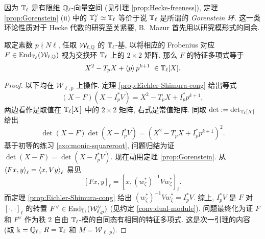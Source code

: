 \begin{remark}
	因为 $\mathbb{T}_\ell$ 是有限维 $\mathbb{Q}_\ell$-向量空间 (见引理 \ref{prop:Hecke-freeness}), 定理 \ref{prop:Gorenstein} (ii) 中的 $\mathbb{T}_\ell^\vee \simeq \mathbb{T}_\ell$ 等价于说 $\mathbb{T}_\ell$ 是所谓的 \emph{Gorenstein 环}. 这一类环论性质对于 Hecke 代数的研究至关紧要, B.\ Mazur 首先用以研究模形式的同余.
\end{remark}

\begin{theorem}\label{prop:Hecke-polynomial}
	取定素数 $p \nmid N\ell$, 任取 $\mathcal{W}_{\ell, \mathbb{Q}}$ 的 $\mathbb{T}_\ell$-基, 以将相应的 Frobenius 对应 $F \in \operatorname{End}_{\mathbb{T}_\ell}(\mathcal{W}_{\ell, \mathbb{Q}})$ 视为交换环 $\mathbb{T}_\ell$ 上的 $2 \times 2$ 矩阵. 那么 $F$ 的特征多项式等于
	\[ X^2 - T_p X + \left\langle p \right\rangle p^{k+1} \; \in \mathbb{T}_\ell[X]. \]
\end{theorem}
\begin{proof}
	以下均在 $\mathcal{W}_{\ell, p}$ 上操作. 定理 \ref{prop:Eichler-Shimura-cong} 给出等式
	\[ (X - F) (X - I_p^* V ) = X^2 - T_p X + I_p^* p^{k+1}, \]
	两边看作是取值在 $\mathbb{T}_\ell[X]$ 中的 $2 \times 2$ 矩阵, 右式是常值矩阵. 同取 $\det := \det_{\mathbb{T}_\ell[X]}$ 给出
	\[ \det\left( X - F \right) \det\left(X - I_p^* V \right) = \left( X^2 - T_p X + I_p^* p^{k+1} \right)^2. \]
	基于初等的练习 \ref{exo:monic-squareroot}, 问题归结为证 $\det(X - F) = \det(X - I_p^* V)$. 现在动用定理 \ref{prop:Gorenstein}. 从 $\left\langle Fx, y \right\rangle_\ell = \left\langle x, Vy \right\rangle_\ell$ 易见
	\[ \left[ Fx, y \right]_\ell = \left[ x, (w_\zeta^*)^{-1} V w_\zeta^* \right]_\ell. \]
	而定理 \ref{prop:Eichler-Shimura-cong} 给出 $(w_\zeta^*)^{-1} V w_\zeta^* = I_p^* V$. 综上, $I_p^* V$ 是 $F$ 对 $[\cdot, \cdot]_\ell$ 的转置 $F^\vee \in \operatorname{End}_{\mathbb{T}_\ell}(\mathcal{W}_{\ell, p}^\vee)$ (见约定 \ref{conv:dual-module}). 问题最终化为证 $F$ 和 $F^\vee$ 作为秩 $2$ 自由 $\mathbb{T}_\ell$-模的自同态有相同的特征多项式. 这是次一引理的内容 (取 $\Bbbk = \mathbb{Q}_\ell$, $R = \mathbb{T}_\ell$ 和 $M = \mathcal{W}_{\ell, p}$).
\end{proof}


